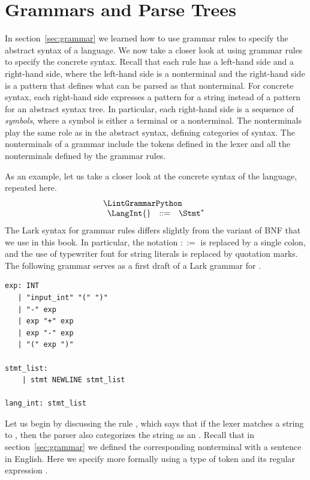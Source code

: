 \documentclass[7x10]{TimesAPriori_MIT}%
\numberwithin{theorem}{chapter}
\numberwithin{definition}{chapter}
\numberwithin{equation}{chapter}
\begin{document}
{\section{Grammars and Parse Trees}
\label{sec:CFG}

In section~\ref{sec:grammar} we learned how to use grammar rules to
specify the abstract syntax of a language. We now take a closer look
at using grammar rules to specify the concrete syntax. Recall that
each rule has a left-hand side and a right-hand side, where the
left-hand side is a nonterminal and the right-hand side is a pattern
that defines what can be parsed as that nonterminal.  For concrete
syntax, each right-hand side expresses a pattern for a string instead
of a pattern for an abstract syntax tree. In particular, each
right-hand side is a sequence of
\emph{symbols}, where a symbol is either a
terminal or a nonterminal. The nonterminals play the same role as in
the abstract syntax, defining categories of syntax. The nonterminals
of a grammar include the tokens defined in the lexer and all the
nonterminals defined by the grammar rules.

As an example, let us take a closer look at the concrete syntax of the
\LangInt{} language, repeated here.
\[
\begin{array}{l}
  \LintGrammarPython  \\
  \begin{array}{rcl}
    \LangInt{} &::=& \Stmt^{*}
  \end{array}
\end{array}
\]
The Lark syntax for grammar rules differs slightly from the variant of
BNF that we use in this book. In particular, the notation $::=$ is
replaced by a single colon, and the use of typewriter font for string
literals is replaced by quotation marks. The following grammar serves
as a first draft of a Lark grammar for \LangInt{}.
\begin{center}
\begin{minipage}{0.95\textwidth}
\begin{lstlisting}[escapechar=$]
exp: INT
   | "input_int" "(" ")"
   | "-" exp
   | exp "+" exp
   | exp "-" exp
   | "(" exp ")"

stmt_list:
    | stmt NEWLINE stmt_list

lang_int: stmt_list
\end{lstlisting}
\end{minipage}
\end{center}

Let us begin by discussing the rule , which says that
if the lexer matches a string to , then the parser also
categorizes the string as an .  Recall that in
section~\ref{sec:grammar} we defined the corresponding \Int{}
nonterminal with a sentence in English. Here we specify 
more formally using a type of token  and its regular
expression .

}
\end{document}
